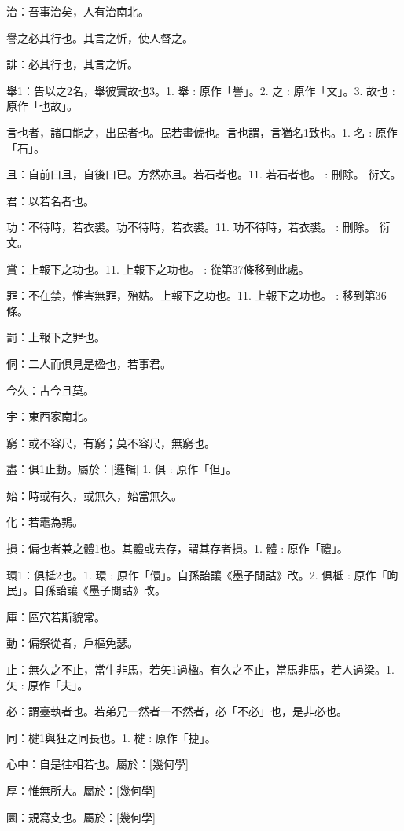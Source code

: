 \begin{pinyinscope}
治：吾事治矣，人有治南北。

譽之必其行也。其言之忻，使人督之。

誹：必其行也，其言之忻。

舉1：告以之2名，舉彼實故也3。1. 舉 : 原作「譽」。2. 之 : 原作「文」。3. 故也 : 原作「也故」。

言也者，諸口能之，出民者也。民若畫俿也。言也謂，言猶名1致也。1. 名 : 原作「石」。

且：自前曰且，自後曰已。方然亦且。若石者也。11. 若石者也。 : 刪除。 衍文。

君：以若名者也。

功：不待時，若衣裘。功不待時，若衣裘。11. 功不待時，若衣裘。 : 刪除。 衍文。

賞：上報下之功也。11. 上報下之功也。 : 從第37條移到此處。

罪：不在禁，惟害無罪，殆姑。上報下之功也。11. 上報下之功也。 : 移到第36條。

罰：上報下之罪也。

侗：二人而俱見是楹也，若事君。

今久：古今且莫。

宇：東西家南北。

窮：或不容尺，有窮；莫不容尺，無窮也。

盡：俱1止動。屬於：[邏輯] 
1. 俱 : 原作「但」。

始：時或有久，或無久，始當無久。

化：若鼃為鶉。

損：偏也者兼之體1也。其體或去存，謂其存者損。1. 體 : 原作「禮」。



環1：俱柢2也。1. 環 : 原作「儇」。自孫詒讓《墨子閒詁》改。2. 俱柢 : 原作「昫民」。自孫詒讓《墨子閒詁》改。

庫：區穴若斯貌常。

動：偏祭從者，戶樞免瑟。

止：無久之不止，當牛非馬，若矢1過楹。有久之不止，當馬非馬，若人過梁。1. 矢 : 原作「夫」。

必：謂臺執者也。若弟兄一然者一不然者，必「不必」也，是非必也。



同：楗1與狂之同長也。1. 楗 : 原作「捷」。

心中：自是往相若也。屬於：[幾何學]

厚：惟無所大。屬於：[幾何學]





圜：規寫攴也。屬於：[幾何學]


\end{pinyinscope}
